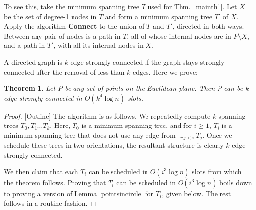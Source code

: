 \documentclass[11pt]{amsart}
\newcounter{foo}
\newtheorem{theorem}[foo]{Theorem}
\begin{document}
To see this, take the minimum spanning tree $T$ used for
Thm.~\ref{mainth1}. Let $X$ be the set of degree-1 nodes in $T$ and
form a minimum spanning tree $T'$ of $X$. Apply the algorithm \textbf{Connect}
to the union of $T$
and $T'$, directed in both ways. Between any pair of nodes is a path in
$T$, all of whose internal nodes are in $P \setminus X$, and a path in $T'$,
with all its internal nodes in $X$.

\iffalse To prove this, take the minimum spanning tree $T$ used for
Thm.~\ref{mainth1}. Let $p_c$ be its root, and let $\text{depth}(p)$
be the depth of $p$ in $T$ (when rooted at $p_c$). Let $P_1 = \{p_c\}
\cup \{p: \text{depth}(p) \text{ is even}\}$ and $P_2 = \{p_c\} \cup
\{p: \text{depth}(p) \text{ is odd}\}$. Now we can schedule MSTs $T_1$
and $T_2$ on each of them in $O(\log n)$ slots, each rooted at
$p_c$. It is clear that if we remove any point $p \neq p_c$ the union
of $T \cup T_1 \cup T_2$ still remains connected. However, $p_c$
itself is still an articulation point. To avoid this problem we can
orient $T$ towards some other root, and perform the same process, thus
assuring that the removal of $p_c$ is not problematic.
\fi

\smallskip

A directed graph is $k$-edge strongly connected if the graph stays strongly connected after the removal of less than $k$-edges.
Here we prove:
\begin{theorem}
Let $P$ be any set of points on the Euclidean plane. Then $P$ can be $k$-edge strongly connected in $O(k^4 \log n)$
slots.
\label{mainth2}
\end{theorem}
\begin{proof}{[Outline]}
The algorithm is as follows. We repeatedly compute $k$ spanning trees
$T_0, T_1 \ldots T_{k}$. Here, $T_0$ is a minimum spanning tree, and
for $i \geq 1$, $T_i$ is a minimum spanning tree that does not use any
edge from $\cup_{j < i} T_j$. Once we schedule these trees in two
orientations, the resultant structure is clearly $k$-edge strongly
connected.

We then claim that each $T_i$ can be scheduled in $O(i^3 \log n)$
slots from which the theorem follows. Proving that $T_i$ can be
scheduled in $O(i^3 \log n)$ boils down to proving a version of Lemma
\ref{pointsincircle} for $T_i$, 
given below.
The rest follows in a routine fashion.
\end{proof}
\end{document}

